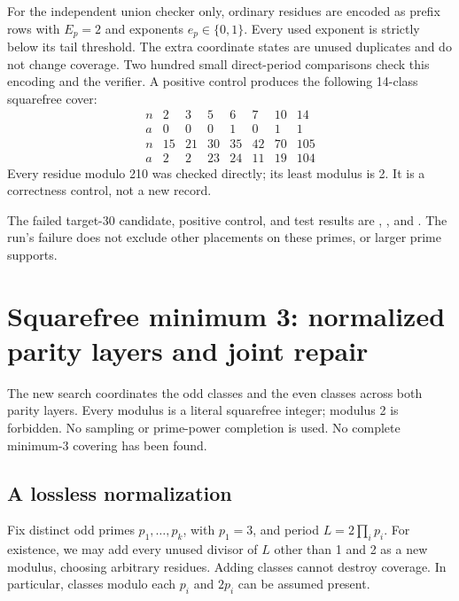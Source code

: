 \documentclass[11pt]{article}
\begin{document}
For the independent union checker only, ordinary residues are encoded
as prefix rows with $E_p=2$ and exponents $e_p\in\{0,1\}$. Every used
exponent is strictly below its tail threshold. The extra coordinate states
are unused duplicates and do not change coverage. Two hundred small
direct-period comparisons check this encoding and the verifier.
A positive control produces the following 14-class squarefree cover:
\[
\begin{array}{c|rrrrrrr}
n&2&3&5&6&7&10&14\\
a&0&0&0&1&0&1&1\\ \hline
n&15&21&30&35&42&70&105\\
a&2&2&23&24&11&19&104
\end{array}
\]
Every residue modulo 210 was checked directly; its least modulus is 2.
It is a correctness control, not a new record.

The failed target-30 candidate, positive control, and test results are
,
, and
. The run's failure does not
exclude other placements on these primes, or larger prime supports.

\section{Squarefree minimum 3: normalized parity layers and joint repair}
\label{sec:parity3}

The new search coordinates the odd classes and the even classes across
both parity layers. Every modulus is a literal squarefree integer; modulus
2 is forbidden. No sampling or prime-power completion is used. No complete
minimum-3 covering has been found.

\subsection{A lossless normalization}
Fix distinct odd primes $p_1,\ldots,p_k$, with $p_1=3$, and period
$L=2\prod_i p_i$. For existence, we may add every unused divisor of $L$
other than 1 and 2 as a new modulus, choosing arbitrary residues. Adding
classes cannot destroy coverage. In particular, classes modulo each $p_i$
and $2p_i$ can be assumed present.
\end{document}
